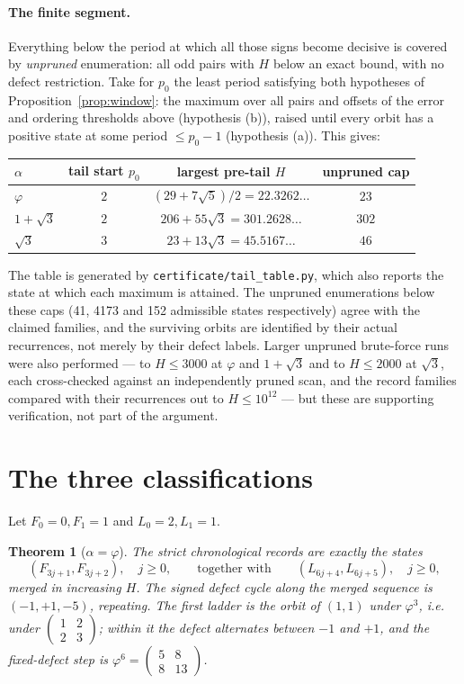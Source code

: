 \documentclass[11pt]{article}
\newtheorem{theorem}{Theorem}[section]
\theoremstyle{definition}
\theoremstyle{remark}
\newcommand{\mat}[4]{\left(\begin{smallmatrix}#1&#2\\#3&#4\end{smallmatrix}\right)}
\begin{document}
\paragraph{The finite segment.}
Everything below the period at which all those signs become decisive is covered by
\emph{unpruned} enumeration: all odd pairs with $H$ below an exact bound, with no defect
restriction. Take for $p_0$ the least period satisfying both hypotheses of
Proposition~\ref{prop:window}: the maximum over all pairs and offsets of the error and
ordering thresholds above (hypothesis (b)), raised until every orbit has a positive state at
some period $\le p_0-1$ (hypothesis (a)). This gives:
\begin{center}
\begin{tabular}{lccc}
\toprule
$\alpha$ & tail start $p_0$ & largest pre-tail $H$ & unpruned cap \\
\midrule
$\varphi$ & $2$ & $(29+7\sqrt5)/2=22.3262\ldots$ & $23$ \\
$1+\sqrt3$ & $2$ & $206+55\sqrt3=301.2628\ldots$ & $302$ \\
$\sqrt3$ & $3$ & $23+13\sqrt3=45.5167\ldots$ & $46$ \\
\bottomrule
\end{tabular}
\end{center}
\noindent The table is generated by \texttt{certificate/tail\_table.py}, which also reports the
state at which each maximum is attained. The unpruned enumerations below these caps (41, 4173 and 152 admissible states respectively)
agree with the claimed families, and the surviving orbits are identified by their actual
recurrences, not merely by their defect labels. Larger unpruned brute-force runs were also performed --- to
$H\le3000$ at $\varphi$ and $1+\sqrt3$ and to $H\le2000$ at $\sqrt3$, each cross-checked against
an independently pruned scan, and the record families compared with their recurrences out to
$H\le10^{12}$ --- but these are supporting verification, not part of the argument.

\section{The three classifications}\label{sec:classify}

Let $F_0=0,F_1=1$ and $L_0=2,L_1=1$.

\begin{theorem}[$\alpha=\varphi$]\label{thm:A}
The strict chronological records are exactly the states
\[
(F_{3j+1},F_{3j+2}),\quad j\ge0,\qquad\text{together with}\qquad (L_{6j+4},L_{6j+5}),\quad j\ge0,
\]
merged in increasing $H$. The signed defect cycle along the merged sequence is
$(-1,+1,-5)$, repeating. The first ladder is the orbit of $(1,1)$ under $\varphi^3$,
i.e. under $\mat{1}{2}{2}{3}$; within it the defect alternates between $-1$ and $+1$, and the
fixed-defect step is $\varphi^6=\mat{5}{8}{8}{13}$.
\end{theorem}
\end{document}
